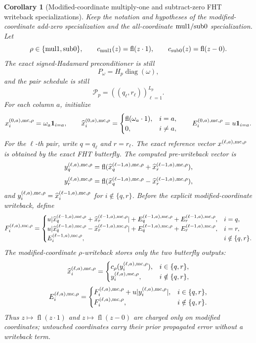 \documentclass[11pt]{article}
\newcommand{\fl}{\operatorname{fl}}
\newcommand{\diag}{\operatorname{diag}}
\newtheorem{corollary}[theorem]{Corollary}
\theoremstyle{remark}
\begin{document}
\begin{corollary}[Modified-coordinate multiply-one and subtract-zero FHT writeback specializations]
Keep the notation and hypotheses of the modified-coordinate add-zero
specialization and the all-coordinate \({\rm mul1}/{\rm sub0}\)
specialization.  Let
\[
  \rho\in\{{\rm mul1},{\rm sub0}\},
  \qquad
  c_{\rm mul1}(z)=\fl(z\cdot1),
  \qquad
  c_{\rm sub0}(z)=\fl(z-0).
\]
The exact signed-Hadamard preconditioner is still
\[
  P_\omega=H_p\diag(\omega),
\]
and the pair schedule is still
\[
  \mathcal P_p=((q_\ell,r_\ell))_{\ell=1}^{L_p}.
\]
For each column \(a\), initialize
\[
  x_i^{(0,a),{\rm mc},\rho}=\omega_a{\bf 1}_{i=a},\qquad
  \widehat x_i^{(0,a),{\rm mc},\rho}
  =
  \begin{cases}
    \fl(\omega_a\cdot1),& i=a,\\
    0,& i\ne a,
  \end{cases}
  \qquad
  E_i^{(0,a),{\rm mc},\rho}=u{\bf 1}_{i=a}.
\]
For the \(\ell\)-th pair, write \(q=q_\ell\) and \(r=r_\ell\).  The exact
reference vector \(x^{(\ell,a),{\rm mc},\rho}\) is obtained by the exact FHT
butterfly.  The computed pre-writeback vector is
\[
  y_q^{(\ell,a),{\rm mc},\rho}
    =
    \fl(\widehat x_q^{(\ell-1,a),{\rm mc},\rho}
        +\widehat x_r^{(\ell-1,a),{\rm mc},\rho}),
\]
\[
  y_r^{(\ell,a),{\rm mc},\rho}
    =
    \fl(\widehat x_q^{(\ell-1,a),{\rm mc},\rho}
        -\widehat x_r^{(\ell-1,a),{\rm mc},\rho}),
\]
and \(y_i^{(\ell,a),{\rm mc},\rho}
=\widehat x_i^{(\ell-1,a),{\rm mc},\rho}\) for \(i\notin\{q,r\}\).
Before the explicit modified-coordinate writeback, define
\[
  F_i^{(\ell,a),{\rm mc},\rho}
  =
  \begin{cases}
    u|\widehat x_q^{(\ell-1,a),{\rm mc},\rho}
      +\widehat x_r^{(\ell-1,a),{\rm mc},\rho}|
      +E_q^{(\ell-1,a),{\rm mc},\rho}
      +E_r^{(\ell-1,a),{\rm mc},\rho},& i=q,\\
    u|\widehat x_q^{(\ell-1,a),{\rm mc},\rho}
      -\widehat x_r^{(\ell-1,a),{\rm mc},\rho}|
      +E_q^{(\ell-1,a),{\rm mc},\rho}
      +E_r^{(\ell-1,a),{\rm mc},\rho},& i=r,\\
    E_i^{(\ell-1,a),{\rm mc},\rho},& i\notin\{q,r\}.
  \end{cases}
\]
The modified-coordinate \(\rho\)-writeback stores only the two butterfly
outputs:
\[
  \widehat x_i^{(\ell,a),{\rm mc},\rho}
  =
  \begin{cases}
    c_\rho(y_i^{(\ell,a),{\rm mc},\rho}),& i\in\{q,r\},\\
    y_i^{(\ell,a),{\rm mc},\rho},& i\notin\{q,r\},
  \end{cases}
\]
\[
  E_i^{(\ell,a),{\rm mc},\rho}
  =
  \begin{cases}
    F_i^{(\ell,a),{\rm mc},\rho}
      +u|y_i^{(\ell,a),{\rm mc},\rho}|,& i\in\{q,r\},\\
    F_i^{(\ell,a),{\rm mc},\rho},& i\notin\{q,r\}.
  \end{cases}
\]
Thus \(z\mapsto\fl(z\cdot1)\) and \(z\mapsto\fl(z-0)\) are charged only on
modified coordinates; untouched coordinates carry their prior propagated
error without a writeback term.


\end{corollary}
\end{document}
